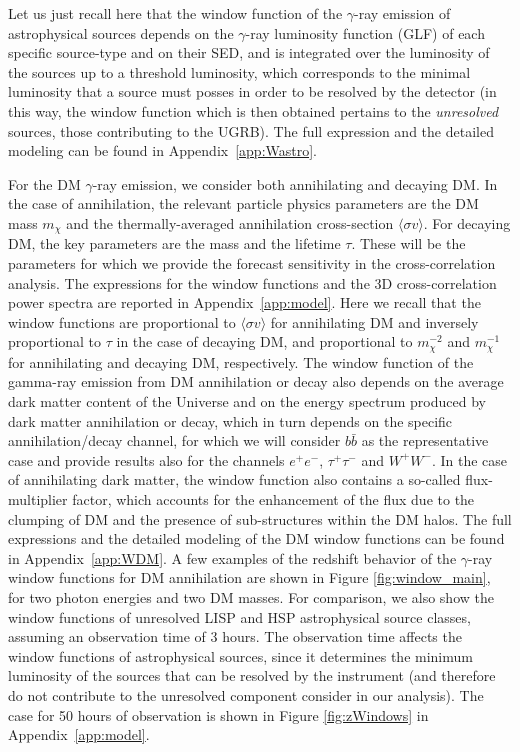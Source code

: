 Let us just recall here that the window function of the $\gamma$-ray emission of astrophysical sources depends on the $\gamma$-ray luminosity function (GLF) of each specific source-type and on their SED, and is integrated over the luminosity of the sources up to a threshold luminosity, which corresponds to the minimal luminosity that a source must posses in order to be resolved by the detector (in this way, the window function which is then obtained pertains to the \textit{unresolved} sources, those contributing to the UGRB). The full expression and the detailed modeling can be found in Appendix~\ref{app:Wastro}.

For the DM $\gamma$-ray emission, we consider both annihilating and decaying DM. In the case of annihilation, the relevant particle physics parameters are the DM mass $m_\chi$ and the thermally-averaged annihilation cross-section $\langle \sigma v\rangle$. For decaying DM, the key parameters are the mass and the lifetime $\tau$. These will be the parameters for which we provide the forecast sensitivity in the cross-correlation analysis. The {expressions for the} window functions and the 3D cross-correlation power spectra are reported in Appendix~\ref{app:model}. 
Here we recall that the window functions are proportional to $\langle \sigma v\rangle$ for annihilating DM and inversely proportional to $\tau$ in the case of decaying DM, and proportional to $m_\chi^{-2}$ and $m_\chi^{-1}$ for annihilating and decaying DM, respectively. The window function of the gamma-ray emission from DM annihilation or decay also depends on the average dark matter content of the Universe and on the energy spectrum produced by dark matter annihilation or decay, which in turn depends on the specific annihilation/decay channel, for which we will consider $b \bar b$ as the representative case and provide results also for the channels $e^+e^-$, $\tau^+\tau^-$ and $W^+W^-$. In the case of annihilating dark matter, the window function also contains a so-called flux-multiplier factor, which accounts for the enhancement of the flux due to the clumping of DM and the presence of sub-structures within the DM halos. The full expressions and the detailed modeling of the DM window functions can be found in Appendix~\ref{app:WDM}. A few examples of the redshift behavior of the $\gamma$-ray window functions for DM annihilation are shown in Figure \ref{fig:window_main}, for two photon energies and two DM masses. For comparison, we also show the window functions of unresolved LISP and HSP astrophysical source classes, assuming an observation time of 3 hours. The observation time affects the window functions of astrophysical sources, since it determines the minimum luminosity of the sources that can be resolved by the instrument (and therefore do not contribute to the unresolved component consider in our analysis). The case for 50 hours of observation is shown in Figure \ref{fig:zWindows} in Appendix~\ref{app:model}.

